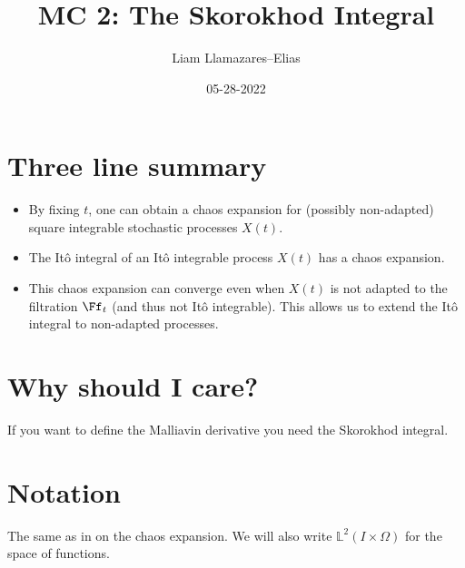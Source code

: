 \documentclass[
    a4paper,
    DIV=14,
    abstract=true,
    numbers=noenddot
]{scrartcl}
\begin{document}
\title{MC 2: The Skorokhod Integral}
\author{Liam Llamazares--Elias}
\date{05-28-2022}
\maketitle
\section{ Three line summary}
\begin{itemize}
	\item By fixing $t$, one can obtain a chaos expansion for (possibly non-adapted) square integrable stochastic processes $X(t)$.
	\item The Itô integral of an Itô integrable process $X(t)$ has a chaos expansion.
	\item This chaos expansion can converge even when $X(t)$ is not adapted to the filtration $\Ff_t$ (and thus not Itô integrable). This allows us to extend the Itô integral to non-adapted processes.
\end{itemize}
\section{Why should I care?}
If you want to define the Malliavin derivative you need the Skorokhod integral.
\section{Notation}
The same as in  on the chaos expansion. We will also write $\mathbb{L}^2(I\times \Omega)$ for the space of   functions.
\end{document}
